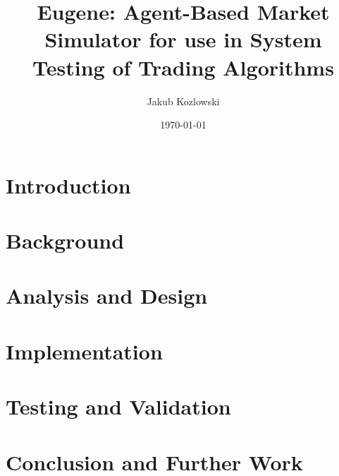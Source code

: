 \documentclass{report}
\title{Eugene: Agent-Based Market Simulator for use in System Testing of Trading Algorithms}
\author{Jakub Kozlowski}
\date{\today}
\begin{document}
\maketitle

\tableofcontents

\chapter{Introduction}

\chapter{Background}

\chapter{Analysis and Design}

\chapter{Implementation}

\chapter{Testing and Validation}

\chapter{Conclusion and Further Work}
\end{document}
